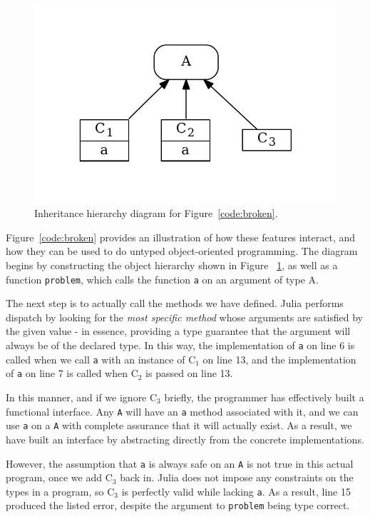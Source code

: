 \documentclass[preprint]{sigplanconf}
\newcommand{\xt}[1]{\texttt{#1}}
\newcommand{\cnum}[2]{$\text{#1}_#2$}
\begin{document}
\begin{figure}
\centering
\vspace{-1em}
\includegraphics[scale=.6]{example2.pdf}
\vspace{-2em}
\caption{Inheritance hierarchy diagram for Figure~\ref{code:broken}.}
\label{fig:algo}
\vspace{-1.3em}
\end{figure}
Figure~\ref{code:broken} provides an illustration of how these features 
interact, and how they can be used to do untyped object-oriented programming.
The diagram begins by constructing the object hierarchy shown in Figure~
\ref{fig:algo}, as well as a function \texttt{problem}, which calls the function 
\xt{a} on an argument of type $\text{A}$. 

The next step is to actually call the methods we have defined. Julia performs
dispatch by looking for the \emph{most specific method} whose arguments are
satisfied by the given value - in essence, providing a type guarantee that the
argument will always be of the declared type. In this way, the implementation 
of \xt{a} on line 6 is called when we call \xt{a} with an instance of $\text{C}_1$
on line 13, and the implementation of \xt{a} on line 7 is called when 
$\text{C}_2$ is passed on line 13.

In this manner, and if we ignore \cnum{C}{3} briefly, the programmer has 
effectively built a functional interface. Any \xt{A} will have an \xt{a} 
method associated with it, and we can use \xt{a} on a \xt{A} with complete
assurance that it will actually exist. As a result, we have built an interface
by abstracting directly from the concrete implementations. 

However, the assumption that \xt{a} is always safe on an \xt{A} is not true
in this actual program, once we add \cnum{C}{3} back in. Julia does not impose
any constraints on the types in a program, so \cnum{C}{3} is perfectly valid
while lacking \xt{a}. As a result, line 15 produced the listed error, despite 
the argument to \xt{problem} being type correct.
\end{document}

